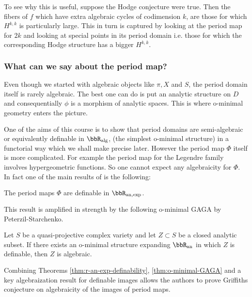 \documentclass[a4paper,12pt]{book}
\begin{document}
To see why this is useful, suppose the Hodge conjecture were true. Then the fibers of $f$ which have extra algebraic cycles of codimension $k$, are those for which $H^{k,k}$ is particularly large. This in turn is captured by looking at the period map for $2k$ and looking at special points in its period domain i.e. those for which the corresponding Hodge structure has a bigger $H^{k,k}$.

\subsubsection{What can we say about the period map?}
\label{sec:what-say-period-map}

Even though we started with algebraic objects like $\pi, X$ and $S$, the period domain itself is rarely algebraic. The best one can do is put an analytic structure on $D$ and consequentially $\phi$ is a morphism of analytic spaces. This is where o-minimal geometry enters the picture. 


One of the aims of this course is to show that period domains are semi-algebraic or equivalently definable in $\bbR_{\mathrm{alg}}$, (the simplest o-minimal structure) in a functorial way which we shall make precise later. However the period map $\Phi$ itself is more complicated. For example the period map for the Legendre family involves hypergeometric functions. So one cannot expect any algebraicity for $\Phi$. In fact one of the main results of \cite{BakkerKlinglerTsimerman2020} is the following:

\begin{thm}\label{thm:r-an-exp-definability}
The period maps $\Phi$ are definable in $\bbR_{\mathrm{an},\exp}$.
\end{thm}
 
This result is amplified in strength by the following o-minimal GAGA by Peterzil-Starchenko. 

\begin{thm}\label{thm:o-minimal-GAGA}
Let $S$ be a quasi-projective complex variety and let $Z \subset S$ be a closed analytic subset. If there exists an o-minimal structure
expanding $\bbR_{\mathrm{an}}$ in which $Z$ is definable, then $Z$ is algebraic.
\end{thm}

Combining Theorems \ref{thm:r-an-exp-definability}, \ref{thm:o-minimal-GAGA} and a key algebraization result for definable images allows the authors to prove Griffiths conjecture on algebraicity of the images of period maps. 
\end{document}
